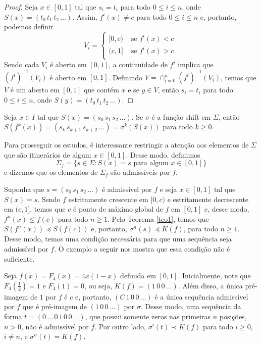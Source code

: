 \begin{proof}
Seja $x \in [0, 1]$ tal que $s_i = t_i$ para todo $0 \leq i \leq n$, onde $S(x) = (t_0\, t_1\, t_2\, \dots)$. Assim, $f^i(x) \neq c$ para todo $0 \leq i \leq n$ e, portanto, podemos definir
\[ V_i = 
\begin{cases} 
  [0, c) & \textrm{ se } f^i(x) < c \\
  (c, 1] & \textrm{ se } f^i(x) > c. \\
\end{cases}
\]
Sendo cada $V_i$ é aberto em $[0, 1]$, a continuidade de $f^i$ implica que $(f^i)^{-1}(V_i)$ é aberto em $[0, 1]$. Definindo $V = \cap_{i=0}^n (f^i)^{-1}(V_i)$, temos que $V$ é um aberto em $[0, 1]$ que contém $x$ e se $y \in V$, então $s_i = t_i$ para todo $0 \leq i \leq n$, onde $S(y) = (t_0\, t_1\, t_2\, \dots)$.  
\end{proof}


Seja $x \in I$ tal que $S(x) = (s_0\, s_1\, s_2\, \dots)$. Se $\sigma$ é a função shift em $\Sigma$, então $S(f^k(x)) = (s_k\, s_{k+1}\, s_{k+2}\, \dots) = \sigma^k(S(x))$ para todo $k \geq 0$.

Para prosseguir os estudos, é interessante restringir a atenção aos elementos de $\Sigma$ que são itinerários de algum $x \in [0, 1]$. Desse modo, definimos
$$\Sigma_f = \{ s \in \Sigma : S(x) = s \text{ para algum } x \in [0, 1] \}$$
e dizemos que os elementos de $\Sigma_f$ são admissíveis por $f$.

Suponha que $s = (s_0\, s_1\, s_2\, \dots)$ é admissível por $f$ e seja $x \in [0, 1]$ tal que $S(x) = s$. Sendo $f$ estritamente crescente em $[0, c)$ e estritamente decrescente em $(c, 1]$, temos que $c$ é ponto de máximo global de $f$ em $[0, 1]$ e, desse modo, $f^n(x) \leq f(c)$ para todo $n \geq 1$. Pelo Teorema \ref{teo1}, temos que $S(f^n(x)) \preceq S(f(c))$ e, portanto, $\sigma^n(s) \preceq K(f)$, para todo $n \geq 1$. Desse modo, temos uma condição necessária para que uma sequência seja admissível por $f$. O exemplo a seguir nos mostra que essa condição não é suficiente.

\begin{example}
Seja $f(x) = F_4(x) = 4x(1-x)$ definida em $[0, 1]$. Inicialmente, note que $F_4\left(\frac{1}{2}\right) = 1$ e $F_4(1) = 0$, ou seja, $K(f) = (1\, 0\, 0\, \dots)$. Além disso, a única pré-imagem de $1$ por $f$ é $c$ e, portanto, $(C\, 1\, 0\, 0\, \dots)$ é a única sequência admissível por $f$ que é pré-imagem de $(1\, 0\, 0\, \dots)$ por $\sigma$. Desse modo, uma sequência da forma $t = (0\, \dots\, 0\, 1\, 0\, 0\, \dots)$, que possui somente zeros nas primeiras $n$ posições, $n > 0$, não é admissível por $f$. Por outro lado, $\sigma^i(t) \prec K(f)$ para todo $i \geq 0$, $i \neq n$, e $\sigma^n(t) = K(f)$. 
\end{example}

